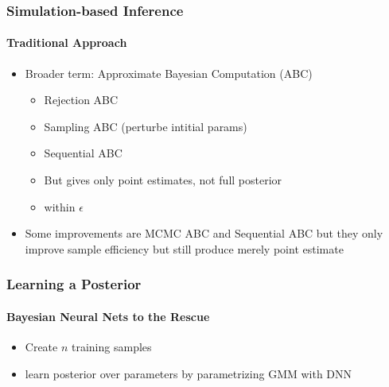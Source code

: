 \documentclass[9pt]{beamer}
\begin{document}
%



\begin{frame}
\frametitle{Simulation-based Inference}
\framesubtitle{Traditional Approach}
\begin{itemize}
	\item Broader term: Approximate Bayesian Computation (ABC)
	\begin{itemize}
		\item Rejection ABC
		\item Sampling ABC (perturbe intitial params)
		\item Sequential ABC
	\end{itemize}
	\begin{itemize}
		\item But gives only point estimates, not full posterior
		\item within $\epsilon$
	\end{itemize}
	\item Some improvements are MCMC ABC and Sequential ABC but they only improve sample efficiency but still produce merely point estimate	
\end{itemize}
\end{frame} 




\begin{frame}
\frametitle{Learning a Posterior}
\framesubtitle{Bayesian Neural Nets to the Rescue}
\begin{itemize}
	\item Create $n$ training samples
	\item learn posterior over parameters by parametrizing GMM with DNN
\end{itemize}
\end{frame}
\end{document}
